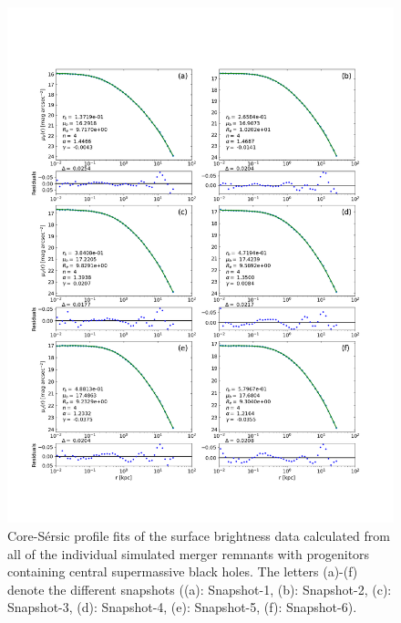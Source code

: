 \documentclass[english, oneside]{HYgradu}
\begin{document}
\begin{figure}[h]
	\centering
	\includegraphics[width=\textwidth]{all_core_profiles.png}
	\caption{Core-Sérsic profile fits of the surface brightness data calculated from all of the individual simulated merger remnants with progenitors containing central supermassive black holes. The letters (a)-(f) denote the different snapshots ((a): Snapshot-1, (b): Snapshot-2, (c): Snapshot-3, (d): Snapshot-4, (e): Snapshot-5, (f): Snapshot-6).}
	\label{figure:all_core}
\end{figure}
\end{document}

